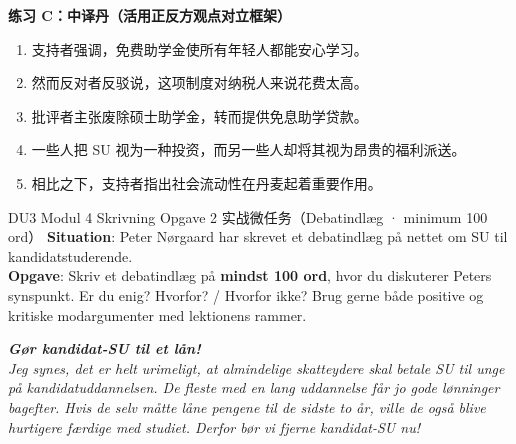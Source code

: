 \textbf{练习 C：中译丹（活用正反方观点对立框架）}
\begin{enumerate}
  \item 支持者强调，免费助学金使所有年轻人都能安心学习。
  \item 然而反对者反驳说，这项制度对纳税人来说花费太高。
  \item 批评者主张废除硕士助学金，转而提供免息助学贷款。
  \item 一些人把 SU 视为一种投资，而另一些人却将其视为昂贵的福利派送。
  \item 相比之下，支持者指出社会流动性在丹麦起着重要作用。
\end{enumerate}


\begin{emailbox}{DU3 Modul 4 Skrivning Opgave 2 实战微任务（Debatindlæg · minimum 100 ord）}
\textbf{Situation}: Peter Nørgaard har skrevet et debatindlæg på nettet om SU til kandidatstuderende.\\
\textbf{Opgave}: Skriv et debatindlæg på \textbf{mindst 100 ord}, hvor du diskuterer Peters synspunkt. Er du enig? Hvorfor? / Hvorfor ikke? Brug gerne både positive og kritiske modargumenter med lektionens rammer.

\vspace{0.3em}
\textit{\textbf{Gør kandidat-SU til et lån!}\\
Jeg synes, det er helt urimeligt, at almindelige skatteydere skal betale SU til unge på kandidatuddannelsen. De fleste med en lang uddannelse får jo gode lønninger bagefter. Hvis de selv måtte låne pengene til de sidste to år, ville de også blive hurtigere færdige med studiet. Derfor bør vi fjerne kandidat-SU nu!}
\end{emailbox}

